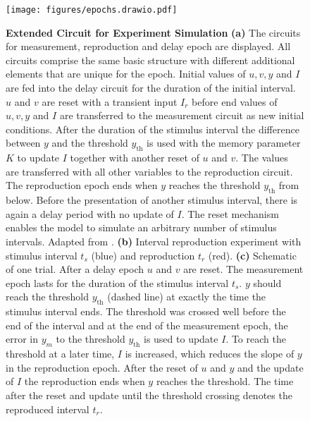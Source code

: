 \documentclass[10pt]{article}
\begin{document}
\begin{figure}
	\centering
	\texttt{[image: figures/epochs.drawio.pdf]}
	\caption{\textbf{Extended Circuit for Experiment Simulation} 
	\textbf{(a)} The circuits for measurement, reproduction and delay epoch are displayed. All circuits comprise the same basic structure with different additional elements that are unique for the epoch. Initial values of $u, v, y$ and $I$ are fed into the delay circuit for the duration of the initial interval. $u$ and $v$ are reset with a transient input $I_r$ before end values of $u, v, y$ and $I$ are transferred to the measurement circuit as new initial conditions. After the duration of the stimulus interval the difference between $y$ and the threshold $y_{\text{th}}$ is used with the memory parameter $K$ to update $I$ together with another reset of $u$ and $v$. The values are transferred with all other variables to the reproduction circuit. The reproduction epoch ends when $y$ reaches the threshold $y_{\text{th}}$ from below. Before the presentation of another stimulus interval, there is again a delay period with no update of $I$. The reset mechanism enables the model to simulate an arbitrary number of stimulus intervals. Adapted from \cite{Egger2020}.
	\textbf{(b)} Interval reproduction experiment with stimulus interval $t_s$ (blue) and reproduction $t_r$ (red).
	\textbf{(c)} Schematic of one trial. After a delay epoch $u$ and $v$ are reset. The measurement epoch lasts for the duration of the stimulus interval $t_s$. $y$ should reach the threshold $y_{\text{th}}$ (dashed line) at exactly the time the stimulus interval ends. The threshold was crossed well before the end of the interval and at the end of the measurement epoch, the error in $y_m$ to the threshold $y_{\text{th}}$ is used to update $I$. To reach the threshold at a later time, $I$ is increased, which reduces the slope of $y$ in the reproduction epoch. After the reset of $u$ and $y$ and the update of $I$ the reproduction ends when $y$ reaches the threshold. The time after the reset and update until the threshold crossing denotes the reproduced interval $t_r$.}
\label{fig:epochs}
\end{figure}
\end{document}
